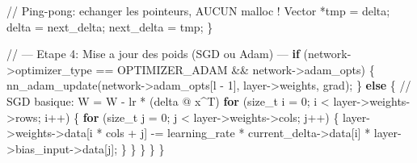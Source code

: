 \documentclass[
  letterpaper,
  DIV=11,
  numbers=noendperiod]{scrartcl}
\newenvironment{Shaded}{\begin{snugshade}}{\end{snugshade}}
\newcommand{\CommentTok}[1]{\textcolor[rgb]{0.37,0.37,0.37}{#1}}
\newcommand{\ControlFlowTok}[1]{\textcolor[rgb]{0.00,0.23,0.31}{\textbf{#1}}}
\newcommand{\DataTypeTok}[1]{\textcolor[rgb]{0.68,0.00,0.00}{#1}}
\newcommand{\DecValTok}[1]{\textcolor[rgb]{0.68,0.00,0.00}{#1}}
\newcommand{\NormalTok}[1]{\textcolor[rgb]{0.00,0.23,0.31}{#1}}
\newcommand{\OperatorTok}[1]{\textcolor[rgb]{0.37,0.37,0.37}{#1}}
\begin{document}
\begin{Shaded}
\begin{Highlighting}[]
            \CommentTok{// Ping-pong: echanger les pointeurs, AUCUN malloc !}
\NormalTok{            Vector }\OperatorTok{*}\NormalTok{tmp }\OperatorTok{=}\NormalTok{ delta}\OperatorTok{;}
\NormalTok{            delta       }\OperatorTok{=}\NormalTok{ next\_delta}\OperatorTok{;}
\NormalTok{            next\_delta  }\OperatorTok{=}\NormalTok{ tmp}\OperatorTok{;}
        \OperatorTok{\}}

        \CommentTok{// --- Etape 4: Mise a jour des poids (SGD ou Adam) ---}
        \ControlFlowTok{if} \OperatorTok{(}\NormalTok{network}\OperatorTok{{-}\textgreater{}}\NormalTok{optimizer\_type }\OperatorTok{==}\NormalTok{ OPTIMIZER\_ADAM }\OperatorTok{\&\&}\NormalTok{ network}\OperatorTok{{-}\textgreater{}}\NormalTok{adam\_opts}\OperatorTok{)} \OperatorTok{\{}
\NormalTok{            nn\_adam\_update}\OperatorTok{(}\NormalTok{network}\OperatorTok{{-}\textgreater{}}\NormalTok{adam\_opts}\OperatorTok{[}\NormalTok{l }\OperatorTok{{-}} \DecValTok{1}\OperatorTok{],}\NormalTok{ layer}\OperatorTok{{-}\textgreater{}}\NormalTok{weights}\OperatorTok{,}\NormalTok{ grad}\OperatorTok{);}
        \OperatorTok{\}} \ControlFlowTok{else} \OperatorTok{\{}
            \CommentTok{// SGD basique: W = W - lr * (delta @ x\^{}T)}
            \ControlFlowTok{for} \OperatorTok{(}\DataTypeTok{size\_t}\NormalTok{ i }\OperatorTok{=} \DecValTok{0}\OperatorTok{;}\NormalTok{ i }\OperatorTok{\textless{}}\NormalTok{ layer}\OperatorTok{{-}\textgreater{}}\NormalTok{weights}\OperatorTok{{-}\textgreater{}}\NormalTok{rows}\OperatorTok{;}\NormalTok{ i}\OperatorTok{++)} \OperatorTok{\{}
                \ControlFlowTok{for} \OperatorTok{(}\DataTypeTok{size\_t}\NormalTok{ j }\OperatorTok{=} \DecValTok{0}\OperatorTok{;}\NormalTok{ j }\OperatorTok{\textless{}}\NormalTok{ layer}\OperatorTok{{-}\textgreater{}}\NormalTok{weights}\OperatorTok{{-}\textgreater{}}\NormalTok{cols}\OperatorTok{;}\NormalTok{ j}\OperatorTok{++)} \OperatorTok{\{}
\NormalTok{                    layer}\OperatorTok{{-}\textgreater{}}\NormalTok{weights}\OperatorTok{{-}\textgreater{}}\NormalTok{data}\OperatorTok{[}\NormalTok{i }\OperatorTok{*}\NormalTok{ cols }\OperatorTok{+}\NormalTok{ j}\OperatorTok{]} \OperatorTok{{-}=}
\NormalTok{                        learning\_rate }\OperatorTok{*}\NormalTok{ current\_delta}\OperatorTok{{-}\textgreater{}}\NormalTok{data}\OperatorTok{[}\NormalTok{i}\OperatorTok{]} \OperatorTok{*}\NormalTok{ layer}\OperatorTok{{-}\textgreater{}}\NormalTok{bias\_input}\OperatorTok{{-}\textgreater{}}\NormalTok{data}\OperatorTok{[}\NormalTok{j}\OperatorTok{];}
                \OperatorTok{\}}
            \OperatorTok{\}}
        \OperatorTok{\}}
    \OperatorTok{\}}
\OperatorTok{\}}
\end{Highlighting}
\end{Shaded}
\end{document}
